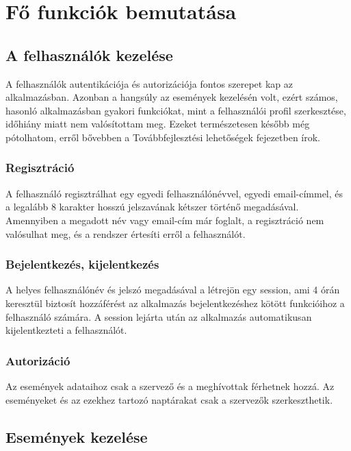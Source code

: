 \documentclass[a4paper,12pt]{report}
\theoremstyle{definition}
\theoremstyle{remark}
\begin{document}
\chapter{Fő funkciók bemutatása}

\section{A felhasználók kezelése}

A felhasználók autentikációja és autorizációja fontos szerepet kap az alkalmazásban. Azonban a hangsúly az események kezelésén volt, ezért számos, hasonló alkalmazásban gyakori funkciókat, mint a felhasználói profil szerkesztése, időhiány miatt nem valósítottam meg. Ezeket természetesen később még pótolhatom, erről bővebben a Továbbfejlesztési lehetőségek fejezetben írok.

	\subsection{Regisztráció}

A felhasználó regisztrálhat egy egyedi felhasználónévvel, egyedi email-címmel, és a legalább 8 karakter hosszú jelszavának kétszer történő megadásával. Amennyiben a megadott név vagy email-cím már foglalt, a regisztráció nem valósulhat meg, és a rendszer értesíti erről a felhasználót.

	\subsection{Bejelentkezés, kijelentkezés}

A helyes felhasználónév és jelszó megadásával a létrejön egy session, ami 4 órán keresztül biztosít hozzáférést az alkalmazás bejelentkezéshez kötött funkcióihoz a felhasználó számára. A session lejárta után az alkalmazás automatikusan kijelentkezteti a felhasználót.

	\subsection{Autorizáció}

Az események adataihoz csak a szervező és a meghívottak férhetnek hozzá. Az eseményeket és az ezekhez tartozó naptárakat csak a szervezők szerkeszthetik.

\section{Események kezelése}
\end{document}
